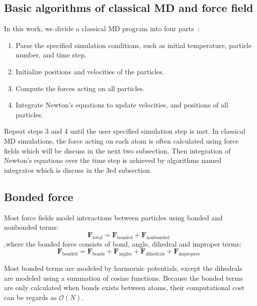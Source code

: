 \documentclass{article}
\begin{document}
\subsection{Basic algorithms of classical MD and force field}

\noindent
In this work, we divide a classical MD program into four parts~\cite{ref1}:
\begin{enumerate}
\item Parse the specified simulation conditions, such as initial temperature, particle number, and time step.
\item Initialize positions and velocities of the particles.
\item Compute the forces acting on all particles.
\item Integrate Newton's equations to update velocities, and positions of all particles.
\end{enumerate}
Repeat steps 3 and 4 until the user specified simulation step is met. 
In classical MD simulations, the force acting on each atom is often calculated 
using force fields which will be discuss in the next two subsection.
Then integration of Newton's equations over the time step is achieved by 
algorithms named integrator which is discuss in the 3rd subsection.


\subsection{Bonded force}

\noindent
Most force fields model interactions between particles using bonded and nonbonded terms:
\begin{equation}
    \boldsymbol{F}_\mathrm{total} =    \boldsymbol{F}_\mathrm{bonded} 
                             + \boldsymbol{F}_\mathrm{nonbonded}
\end{equation}
,where the bonded force consists of bond, angle, dihedral and improper terms:
\begin{equation}
\boldsymbol{F}_\mathrm{bonded} = \boldsymbol{F}_\mathrm{bonds}
                                    + \boldsymbol{F}_\mathrm{angles} 
                                    + \boldsymbol{F}_\mathrm{dihedrals} 
                                    + \boldsymbol{F}_\mathrm{impropers}
\end{equation}

\noindent
Most bonded terms are modeled by harmornic potentials, except the dihedrals are 
modeled using a summation of cosine functions.
Because the bonded terms are only calculated when bonds exists between atoms, 
their computational cost can be regards as $\mathcal{O}(N)$.\\
\end{document}
